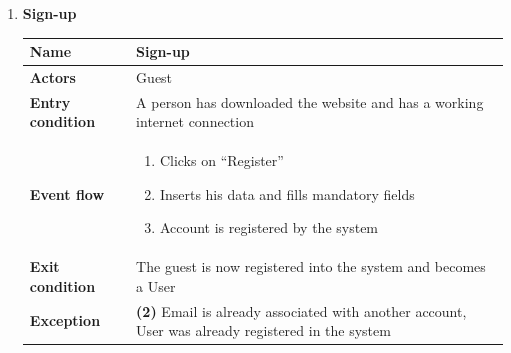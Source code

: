 \documentclass{article}
\begin{document}
\begin{enumerate}[label=\textbf{UC\arabic*}:]
    \item \textbf{Sign-up}
    \begin{center}
        \begin{tabular}{ | m{8em} | m{10cm}|  } 
            \hline 
            \textbf{Name} & Sign-up\\[1ex] 
            \hline 
            \textbf{Actors} & Guest \\[1ex] 
            \hline 
            \textbf{Entry condition} & A person has downloaded the website and has a working internet connection \\[1ex] 
            \hline 
            \textbf{Event flow} & \begin{enumerate}[label=\textbf{\arabic*}:]
                \item Clicks on “Register”
                \item Inserts his data and fills mandatory fields
                \item Account is registered by the system
            \end{enumerate} \\[1ex]
            \hline 
            \textbf{Exit condition} & The guest is now registered into the system and becomes a User \\[1ex]
            \hline 
            \textbf{Exception} & \textbf{(2)} Email is already associated with another account, User was already registered in the system \\[1ex]
            \hline
        \end{tabular}
    \end{center}


\end{enumerate}
\end{document}
